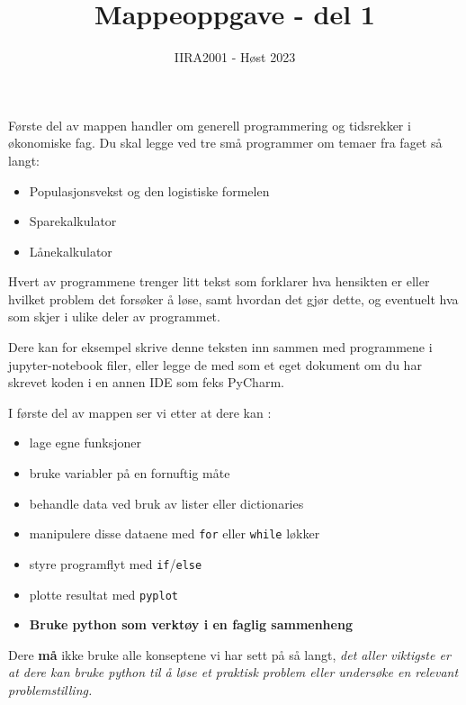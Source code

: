 \documentclass[12pt, titlepage]{article}
\begin{document}
\title{Mappeoppgave - del 1}
\author{IIRA2001 - Høst 2023}
\date{}
\maketitle

Første del av mappen handler om generell programmering og tidsrekker i økonomiske fag.
Du skal legge ved tre små programmer om temaer fra faget så langt:
\begin{itemize}
  \item {Populasjonsvekst og den logistiske formelen}
  \item {Sparekalkulator}
  \item {Lånekalkulator}
\end{itemize}

Hvert av programmene trenger litt tekst som forklarer hva hensikten er eller hvilket problem det forsøker å løse,
samt hvordan det gjør dette, og eventuelt hva som skjer i ulike deler av programmet.

Dere kan for eksempel skrive denne teksten inn sammen med programmene i jupyter-notebook filer, eller
legge de med som et eget dokument om du har skrevet koden i en annen IDE som feks PyCharm.

I første del av mappen ser vi etter at dere kan : 
\begin{itemize}
  \item {lage egne funksjoner}
  \item {bruke variabler på en fornuftig måte}
  \item {behandle data ved bruk av lister eller dictionaries}
  \item {manipulere disse dataene med \texttt{for} eller \texttt{while} løkker}
  \item {styre programflyt med \texttt{if}/\texttt{else}}
  \item {plotte resultat med \texttt{pyplot}}
  \item {\textbf{Bruke python som verktøy i en faglig sammenheng}}
\end{itemize}

Dere \textbf{må} ikke bruke alle konseptene vi har sett på så langt, \textit{det aller viktigste er at dere kan 
bruke python til å løse et praktisk problem eller undersøke en relevant problemstilling.}
\end{document}

